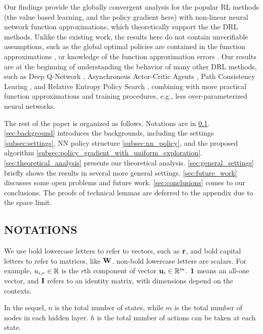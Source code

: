 Our findings provide the globally convergent analysis for the popular RL methods (the value based learning, and the policy gradient here) with non-linear neural network function approximations, which  theoretically support the  the DRL methods. Unlike the existing work, the results here do not contain unverifiable assumptions, such as the global optimal policies are contained in the function approximations \citep{krishnamurthy2016pac}, or knowledge of the function approximation errors \citep{dai2018sbeed}. Our results are at the beginning of understanding the behavior of many other DRL methods, such as Deep Q-Network \cite{mnih2015human}, Asynchronous Actor-Critic Agents \citep{mnih2016asynchronous}, Path Consistency Learing \citep{nachum2017bridging}, and Relative Entropy Policy Search \citep{peters2010relative}, combining with more practical function approximations and training procedures, e.g., less over-parameterized neural networks.

The rest of the paper is organized as follows. Notations are in \cref{subsec:notations}. \cref{sec:background} introduces the backgrounds, including the settings \cref{subsec:settings}, NN policy structure \cref{subsec:nn_policy}, and the proposed algorithm \cref{subsec:policy_gradient_with_uniform_exploration}. \cref{sec:theoretical_analysis} presents our theoretical analysis. \cref{sec:general_settings} briefly shows the results in several more general settings. \cref{sec:future_work} discusses some open problems and future work. \cref{sec:conclusions} comes to our conclusions. The proofs of technical lemmas are deferred to the appendix due to the space limit.

\subsection{NOTATIONS}
\label{subsec:notations}

We use bold lowercase letters to refer to vectors, such as ${\mathbf{r}}$, and bold capital letters to refer to matrices, like ${\mathbf{W}}$. non-bold lowercase letters are scalars. For example, $u_{i,r} \in {\mathbb{R}}$ is the $r$th component of vector ${\mathbf{u}}_i \in {\mathbb{R}}^m$. ${\mathbf{1}}$ means an all-one vector, and ${\mathbf{I}}$ refers to an identity matrix, with dimensions depend on the contexts.

In the sequel, $n$ is the total number of states, while $m$ is the total number of nodes in each hidden layer. $h$ is the total number of actions can be taken at each state.

